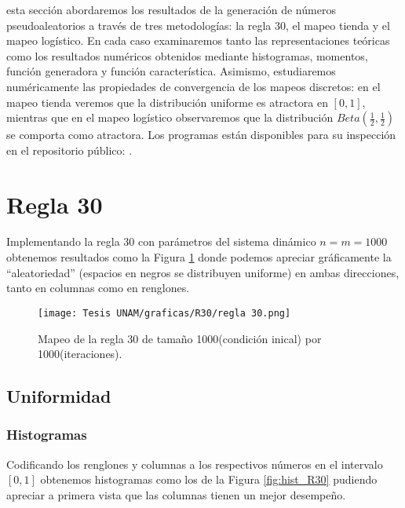 \documentclass[../Main.tex]{subfiles}
\begin{document}
 esta sección abordaremos los resultados de la generación de números pseudoaleatorios a través de tres metodologías: la regla 30, el mapeo tienda y el mapeo logístico. En cada caso examinaremos tanto las representaciones teóricas como los resultados numéricos obtenidos mediante histogramas, momentos, función generadora y función característica. Asimismo, estudiaremos numéricamente las propiedades de convergencia de los mapeos discretos: en el mapeo tienda veremos que la distribución uniforme es atractora en $[0,1]$, mientras que en el mapeo logístico observaremos que la distribución $Beta(\tfrac{1}{2},\tfrac{1}{2})$ se comporta como atractora. Los programas están disponibles para su inspección en el repositorio público: \cite{Lince2024}.
\section{Regla 30}
Implementando la regla 30 con parámetros del sistema dinámico $n=m=1000$ 
obtenemos resultados como la Figura \ref{fig:R30} donde podemos apreciar gráficamente la ``aleatoriedad'' (espacios en negros se distribuyen uniforme) en ambas direcciones, tanto en columnas como en renglones.
\begin{figure}[h!]
    \centering
    \texttt{[image: Tesis UNAM/graficas/R30/regla 30.png]}
    \caption{Mapeo de la regla 30 de tamaño 1000(condición inical) por 1000(iteraciones).}
    \label{fig:R30}
\end{figure} 
\subsection{Uniformidad}
\subsubsection{Histogramas}
Codificando los renglones y columnas a los respectivos números en el intervalo $[0,1]$ obtenemos histogramas como los de la Figura \ref{fig:hist_R30} pudiendo apreciar a primera vista que las columnas tienen un mejor desempeño. 
\end{document}
